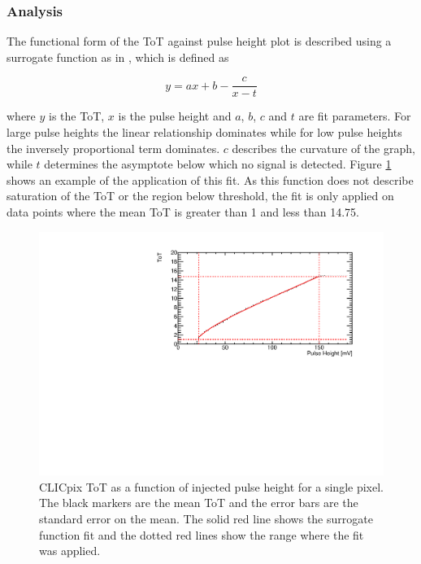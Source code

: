 
\subsubsection{Analysis}

The functional form of the ToT against pulse height plot is described using a surrogate function as in \cite{AlipourTehrani:2054922}, which is defined as

\begin{equation}
y  = ax + b  - \frac{c}{x-t}
\end{equation}

\noindent where $y$ is the ToT, $x$ is the pulse height and $a$, $b$, $c$ and $t$ are fit parameters.  For large pulse heights the linear relationship dominates while for low pulse heights the inversely proportional term dominates.  $c$ describes the curvature of the graph, while $t$ determines the asymptote below which no signal is detected.  Figure \ref{fig:testpulseexamplefit} shows an example of the application of this fit.  As this function does not describe saturation of the ToT or the region below threshold, the fit is only applied on data points where the mean ToT is greater than 1 and less than 14.75.  

\begin{figure}
\centering
\includegraphics[width=1.0\textwidth]{CLICdpVertex/Plots/TestPulseCalibration/Fits/Set9/ToT_PulseHeight_Set_9_ChipID_001ec0db94b1_Pixel_x0_y0_Fit.pdf}
\caption[CLICpix ToT as a function of injected pulse height.]{CLICpix ToT as a function of injected pulse height for a single pixel.  The black markers are the mean ToT and the error bars are the standard error on the mean.  The solid red line shows the surrogate function fit and the dotted red lines show the range where the fit was applied.}
\label{fig:testpulseexamplefit}
\end{figure}

